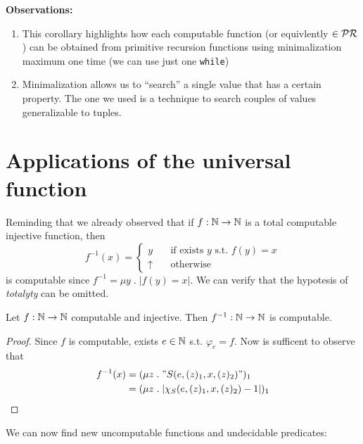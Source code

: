 \textbf{Observations:}
\begin{enumerate}[label=\roman*.]
\item This corollary highlights how each computable function (or
  equivlently $\in\mathcal{PR}$) can be obtained from primitive recursion
  functions using minimalization maximum one time (we can use just one
  \texttt{while})
\item Minimalization allows us to ``search'' a single value that has a
  certain property. The one we used is a technique to search couples
  of values generalizable to tuples.
\end{enumerate}

\section{Applications of the universal function}
Reminding that we already observed that if $f : \mathbb{N} \rightarrow \mathbb{N}$ is a total
computable injective function, then
\[
  f^{-1}(x) = \begin{cases}
    y & \quad \mbox{if exists $y$ s.t. } f(y) = x \\
    \uparrow & \quad \mbox{otherwise}
\end{cases}
\]
is computable since $f^{-1} = \mu y \; . \; |f(y) = x|$. We can verify
that the hypotesis of \emph{totalyty} can be omitted.

\begin{theorem}
  Let $f: \mathbb{N} \rightarrow \mathbb{N}$ computable and injective. Then
  $f^{-1}: \mathbb{N} \rightarrow \mathbb{N}$ is computable.
  \begin{proof}
    Since $f$ is computable, exists $e \in \mathbb{N}$ s.t. $\varphi_e =
    f$. Now is sufficent to observe that
    \[
      \begin{split}
        f^{-1}(x) &= (\mu z \; . \;  "S(e, (z)_1, x, (z)_2)")_1 \\
        &= (\mu z \; . \; |\chi_S(e, (z)_1, x, (z)_2) - 1|)_1
      \end{split}
    \]
  \end{proof}
\end{theorem}

We can now find new uncomputable functions and undecidable predicates:

